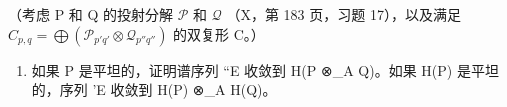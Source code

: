 （考虑 P 和 Q 的投射分解 \(\mathcal{P}\) 和 \(\mathcal{Q}\) （X，第 183 页，习题 17），以及满足 \(C_{p,q} = \bigoplus (\mathcal{P}_{p'q'} \otimes \mathcal{Q}_{p''q''})\) 的双复形 C。）

\begin{enumerate}
\def\labelenumi{\alph{enumi})}
\setcounter{enumi}{1}
\tightlist
\item
  如果 P 是平坦的，证明谱序列 ``E 收敛到 H(P ⊗\_A Q)。如果 H(P) 是平坦的，序列 'E 收敛到 H(P) ⊗\_A H(Q)。
\end{enumerate}

